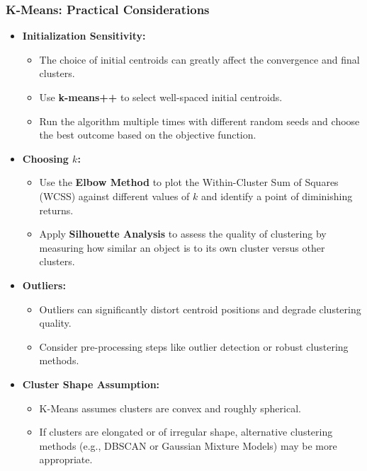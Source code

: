 \documentclass[aspectratio=169]{beamer}
\begin{document}
    \begin{frame}
        \frametitle{K-Means: Practical Considerations}
        \begin{itemize}
            \item \textbf{Initialization Sensitivity:}
                \begin{itemize}
                    \item The choice of initial centroids can greatly affect the convergence and final clusters.
                    \item Use \textbf{k-means++} to select well-spaced initial centroids.
                    \item Run the algorithm multiple times with different random seeds and choose the best outcome based on the objective function.
                \end{itemize}
            \item \textbf{Choosing \(k\):}
                \begin{itemize}
                    \item Use the \textbf{Elbow Method} to plot the Within-Cluster Sum of Squares (WCSS) against different values of \(k\) and identify a point of diminishing returns.
                    \item Apply \textbf{Silhouette Analysis} to assess the quality of clustering by measuring how similar an object is to its own cluster versus other clusters.
                \end{itemize}
            \item \textbf{Outliers:}
                \begin{itemize}
                    \item Outliers can significantly distort centroid positions and degrade clustering quality.
                    \item Consider pre-processing steps like outlier detection or robust clustering methods.
                \end{itemize}
            \item \textbf{Cluster Shape Assumption:}
                \begin{itemize}
                    \item K-Means assumes clusters are convex and roughly spherical.
                    \item If clusters are elongated or of irregular shape, alternative clustering methods (e.g., DBSCAN or Gaussian Mixture Models) may be more appropriate.
                \end{itemize}
        \end{itemize}
        \end{frame}
        
\end{document}
